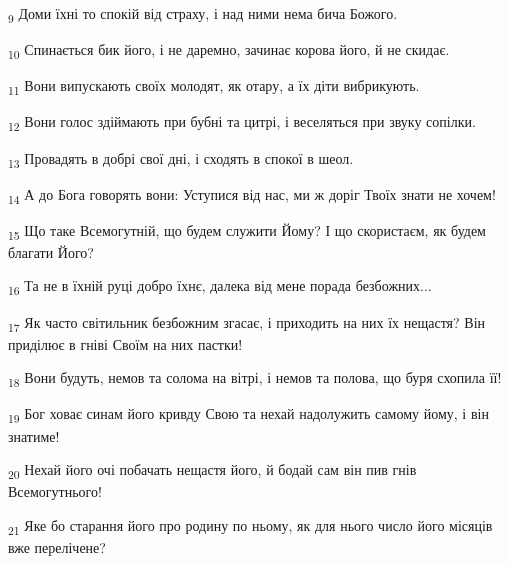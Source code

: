 \begin{tcolorbox}
\textsubscript{9} Доми їхні то спокій від страху, і над ними нема бича Божого.
\end{tcolorbox}
\begin{tcolorbox}
\textsubscript{10} Спинається бик його, і не даремно, зачинає корова його, й не скидає.
\end{tcolorbox}
\begin{tcolorbox}
\textsubscript{11} Вони випускають своїх молодят, як отару, а їх діти вибрикують.
\end{tcolorbox}
\begin{tcolorbox}
\textsubscript{12} Вони голос здіймають при бубні та цитрі, і веселяться при звуку сопілки.
\end{tcolorbox}
\begin{tcolorbox}
\textsubscript{13} Провадять в добрі свої дні, і сходять в спокої в шеол.
\end{tcolorbox}
\begin{tcolorbox}
\textsubscript{14} А до Бога говорять вони: Уступися від нас, ми ж доріг Твоїх знати не хочем!
\end{tcolorbox}
\begin{tcolorbox}
\textsubscript{15} Що таке Всемогутній, що будем служити Йому? І що скористаєм, як будем благати Його?
\end{tcolorbox}
\begin{tcolorbox}
\textsubscript{16} Та не в їхній руці добро їхнє, далека від мене порада безбожних...
\end{tcolorbox}
\begin{tcolorbox}
\textsubscript{17} Як часто світильник безбожним згасає, і приходить на них їх нещастя? Він приділює в гніві Своїм на них пастки!
\end{tcolorbox}
\begin{tcolorbox}
\textsubscript{18} Вони будуть, немов та солома на вітрі, і немов та полова, що буря схопила її!
\end{tcolorbox}
\begin{tcolorbox}
\textsubscript{19} Бог ховає синам його кривду Свою та нехай надолужить самому йому, і він знатиме!
\end{tcolorbox}
\begin{tcolorbox}
\textsubscript{20} Нехай його очі побачать нещастя його, й бодай сам він пив гнів Всемогутнього!
\end{tcolorbox}
\begin{tcolorbox}
\textsubscript{21} Яке бо старання його про родину по ньому, як для нього число його місяців вже перелічене?
\end{tcolorbox}
